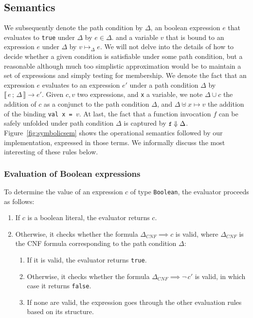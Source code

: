 \documentclass[a4paper,twoside]{article}
\newcommand{\lb}[2]{\llbracket\, #1\,;\, #2\, \rrbracket}
\newcommand{\InlineS}[1]{\lstinline[language=PureScala,basicstyle=\small\ttfamily,columns=fixed]|#1|}
\newcommand{\RefFig}[1]{Figure~\ref{#1}}
\newcommand{\stt}[1]{\texttt{\small{#1}}}
\begin{document}
\subsection{Semantics}

We subsequently denote the path condition by $\Delta$, an boolean expression $e$ that  evaluates to \InlineS{true} under $\Delta$ by $e \in \Delta$. and a variable $v$ that is bound to an expression $e$ under $\Delta$ by $v \mapsto_\Delta e$. We will not delve into the details of how to decide whether a given condition is satisfiable under some path condition, but a reasonable although much too simplistic approximation would be to maintain a set of expressions and simply testing for membership. We denote the fact that an expression $e$ evaluates to an expression $e'$ under a path condition $\Delta$ by $\lb{e}{\Delta} \longrightarrow e'$. Given $c, v$ two expressions, and \stt{x} a variable, we note $\Delta \cup c$ the addition of $c$ as a conjunct to the path condition $\Delta$, and $\Delta \uplus x \mapsto v$ the addition of the binding \stt{val x = $v$}. At last, the fact that a function invocation $f$ can be safely unfolded under path condition $\Delta$ is captured by $\stt{f} \Downarrow \Delta$. \RefFig{fig:symbolicsem} shows the operational semantics followed by our implementation, expressed in those terms. We informally discuss the most interesting of these rules below.

\subsubsection*{Evaluation of Boolean expressions}

To determine the value of an expression $c$ of type \stt{Boolean}, the evaluator proceeds as follows:

\begin{enumerate}
\item If $c$ is a boolean literal, the evaluator returns $c$.
\item Otherwise, it checks whether the  formula $\Delta_{CNF} \implies c$ is valid, where $\Delta_{CNF}$ is the CNF formula corresponding to the path condition $\Delta$:
\begin{enumerate}
\item If it is valid, the evaluator returns \InlineS{true}.
\item Otherwise, it checks whether the formula $\Delta_{CNF} \implies \neg\,c'$ is valid, in which case it returns \InlineS{false}.
\item If none are valid, the expression goes through the other evaluation rules based on its structure.
\end{enumerate}
\end{enumerate}
\end{document}
